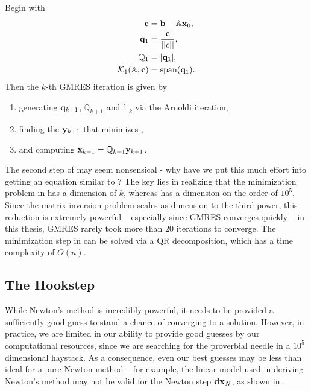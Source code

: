   \begin{algorithm}\label{alg:GMRES}
   Begin with
 \begin{align*}
 \mathbf{c} &= \mathbf{b} - \mathbb{A}\mathbf{x}_0,\\
  \mathbf{q}_1 &= \dfrac{\mathbf{c}}{||c||}, \\
  \mathbb{Q}_1 &= [\mathbf{q}_1],\\
  \mathcal{K}_1(\mathbb{A},\mathbf{c}) &= \mathrm{span}(\mathbf{q}_1).
  \end{align*}
  Then the $k$-th GMRES iteration is given by  
  \begin{enumerate}
  \item generating $\mathbf{q}_{k+1}$, $\mathbb{Q}_{k+1}$ and $\mathbb{\tilde{H}}_k$ via the Arnoldi iteration,
  \item finding the $\mathbf{y}_{k+1}$ that minimizes ,
  \item and computing $\mathbf{x}_{k+1} = \mathbb{Q}_{k+1}\mathbf{y}_{k+1}$.
  \end{enumerate}
  \end{algorithm}

 The second step of  may seem nonsensical - why have we put this much effort into getting an equation similar to ? The key lies in realizing that the minimization problem in   has a dimension of $k$, whereas  has a dimension on the order of $10^5$. Since the matrix inversion problem scales as dimension to the third power, this reduction is extremely powerful -- especially since GMRES converges quickly -- in this thesis, GMRES rarely took more than 20 iterations to converge. The minimization step in   can be solved via a QR decomposition, which has a time complexity of $O(n)$.  
 
 \subsection{The Hookstep}
 
 While Newton's method is incredibly powerful, it needs to be provided a sufficiently good guess to stand a chance of converging to a solution. However, in practice, we are limited in our ability to provide good guesses by our computational resources, since we are searching for the proverbial needle in a $10^5$ dimensional haystack. As a consequence, even our best guesses may be less than ideal for a pure Newton method -- for example, the linear model used in deriving Newton's method may not be valid for the Newton step $\mathbf{dx}_N$, as shown in . 

